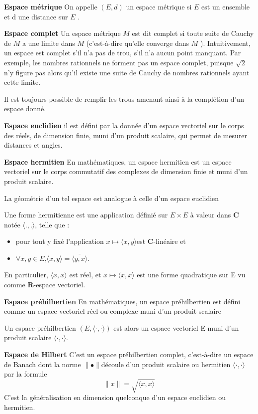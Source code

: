 \documentclass{book}
\begin{document}
\textbf{Espace m\'etrique}
On appelle $(E, d)$ un espace m\'etrique si $ E$  est un ensemble et d une distance sur $E$ .

\textbf{Espace complet}
Un espace m\'etrique $ M$  est dit complet si toute suite de Cauchy de $ M$  a une limite dans $ M$  (c'est-\`a-dire qu'elle converge dans $M$ ).\newline
Intuitivement, un espace est complet s'il n'a pas de trou, s'il n'a aucun point manquant. \newline
Par exemple, les nombres rationnels ne forment pas un espace complet, puisque $\sqrt{2}$ n'y figure pas alors qu'il existe une suite de Cauchy de nombres rationnels ayant cette limite.

Il est toujours possible de remplir les trous amenant ainsi \`a la compl\'etion d'un espace donn\'e.

\textbf{Espace euclidien}
 il est d\'efini par la donn\'ee d'un espace vectoriel sur le corps des r\'eels, de dimension finie, muni d'un produit scalaire, qui permet de mesurer distances et angles.

\textbf{Espace hermitien}
En math\'ematiques, un espace hermitien est un espace vectoriel sur le corps commutatif des complexes de dimension finie et muni d'un produit scalaire.

La g\'eom\'etrie d'un tel espace est analogue \`a celle d'un espace euclidien

Une forme hermitienne est une application d\'efini\'e sur $E \times E$ \`a valeur dans $\mathbf{C}$ not\'ee $\langle .,.\rangle$, telle que :
\begin{itemize}
		\item pour tout y fix\'e l'application $x \mapsto \langle x,y\rangle $est $\mathbf{C}$-lin\'eaire et
		\item $\forall x,y \in E$,$\langle x,y\rangle=\overline{ \langle y,x\rangle}$.
\end{itemize}
En particulier, $\langle x,x\rangle$ est r\'eel, et $x\mapsto \langle x,x\rangle$ est une forme quadratique sur E vu comme $\mathbf{R}$-espace vectoriel.

\textbf{Espace pr\'ehilbertien}
En math\'ematiques, un espace pr\'ehilbertien est d\'efini comme un espace vectoriel r\'eel ou complexe muni d'un produit scalaire

Un espace pr\'ehilbertien $(E,\langle\cdot,\cdot\rangle)$ est alors un espace vectoriel E muni d'un produit scalaire $\langle\cdot,\cdot\rangle$.

\textbf{Espace de Hilbert}
C'est un espace pr\'ehilbertien complet, c'est-\`a-dire un espace de Banach dont la norme $\parallel\bullet\parallel$d\'ecoule d'un produit scalaire ou hermitien $\langle\cdot,\cdot\rangle$ par la formule
 $$\parallel x\parallel = \sqrt{\langle x,x \rangle}$$
C'est la g\'en\'eralisation en dimension quelconque d'un espace euclidien ou hermitien.
\bigskip
\end{document}

